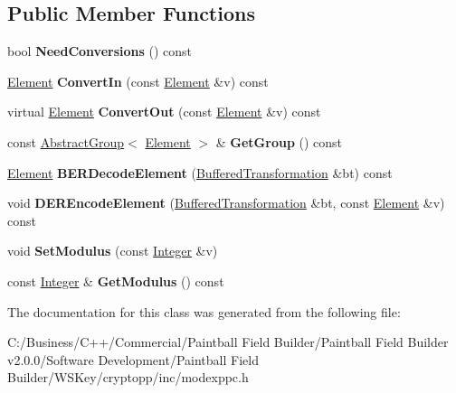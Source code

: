 \subsection*{Public Member Functions}
\begin{DoxyCompactItemize}
\item 
\hypertarget{class_mod_exp_precomputation_a3ef429606ee7616c4ab52f39368b0580}{
bool {\bfseries NeedConversions} () const }
\label{class_mod_exp_precomputation_a3ef429606ee7616c4ab52f39368b0580}

\item 
\hypertarget{class_mod_exp_precomputation_a11c5a3d079ee1db897ce7559e870d8c7}{
\hyperlink{class_integer}{Element} {\bfseries ConvertIn} (const \hyperlink{class_integer}{Element} \&v) const }
\label{class_mod_exp_precomputation_a11c5a3d079ee1db897ce7559e870d8c7}

\item 
\hypertarget{class_mod_exp_precomputation_a4649767885507288e3df2db9d5af404d}{
virtual \hyperlink{class_integer}{Element} {\bfseries ConvertOut} (const \hyperlink{class_integer}{Element} \&v) const }
\label{class_mod_exp_precomputation_a4649767885507288e3df2db9d5af404d}

\item 
\hypertarget{class_mod_exp_precomputation_ae80385124dd7147676e7153171c66d4f}{
const \hyperlink{class_abstract_group}{AbstractGroup}$<$ \hyperlink{class_integer}{Element} $>$ \& {\bfseries GetGroup} () const }
\label{class_mod_exp_precomputation_ae80385124dd7147676e7153171c66d4f}

\item 
\hypertarget{class_mod_exp_precomputation_a649492a899579cf607b11dcfb1724079}{
\hyperlink{class_integer}{Element} {\bfseries BERDecodeElement} (\hyperlink{class_buffered_transformation}{BufferedTransformation} \&bt) const }
\label{class_mod_exp_precomputation_a649492a899579cf607b11dcfb1724079}

\item 
\hypertarget{class_mod_exp_precomputation_a489890753aae809b6ef7db9922bf32f0}{
void {\bfseries DEREncodeElement} (\hyperlink{class_buffered_transformation}{BufferedTransformation} \&bt, const \hyperlink{class_integer}{Element} \&v) const }
\label{class_mod_exp_precomputation_a489890753aae809b6ef7db9922bf32f0}

\item 
\hypertarget{class_mod_exp_precomputation_aa8354f97205420217eb8e85d0229e604}{
void {\bfseries SetModulus} (const \hyperlink{class_integer}{Integer} \&v)}
\label{class_mod_exp_precomputation_aa8354f97205420217eb8e85d0229e604}

\item 
\hypertarget{class_mod_exp_precomputation_a09fb26ad3b6fd8d5861028e98de9e4d7}{
const \hyperlink{class_integer}{Integer} \& {\bfseries GetModulus} () const }
\label{class_mod_exp_precomputation_a09fb26ad3b6fd8d5861028e98de9e4d7}

\end{DoxyCompactItemize}


The documentation for this class was generated from the following file:\begin{DoxyCompactItemize}
\item 
C:/Business/C++/Commercial/Paintball Field Builder/Paintball Field Builder v2.0.0/Software Development/Paintball Field Builder/WSKey/cryptopp/inc/modexppc.h\end{DoxyCompactItemize}
